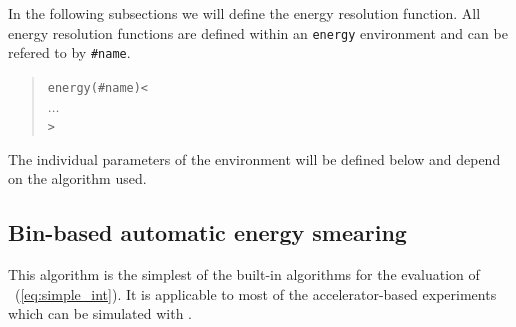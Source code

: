 In the following subsections we will define the energy resolution function.
All energy resolution functions are defined within an {\tt energy} environment and can be refered to by {\tt \#name}.
\begin{quote}
  {\tt energy(\#name)<\\
\tb $\ldots$\\
>}
\end{quote}
The individual parameters of the environment will be defined below and depend on the algorithm used.

\subsection{Bin-based automatic energy smearing}

This algorithm is the simplest of the built-in algorithms for the evaluation
of \eq~(\ref{eq:simple_int}). It is applicable to most of the
 accelerator-based experiments which can be simulated with \GLOBES .

